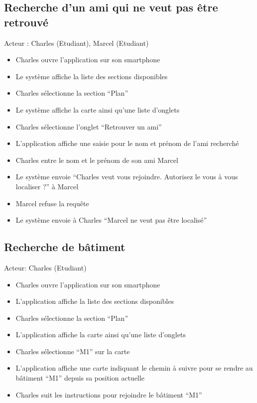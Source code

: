 \subsection*{Recherche d’un ami qui ne veut pas être retrouvé}
Acteur : Charles (Etudiant), Marcel (Etudiant)
\begin{itemize}
\item Charles ouvre l’application sur son smartphone 
\item Le système affiche la liste des sections disponibles 
\item Charles sélectionne la section “Plan” 
\item Le système affiche la carte ainsi qu’une liste d’onglets 
\item Charles sélectionne l’onglet “Retrouver un ami” 
\item L’application affiche une saisie pour le nom et prénom de l'ami recherché 
\item Charles entre le nom et le prénom de son ami Marcel 
\item Le système envoie “Charles veut vous rejoindre.  Autorisez le vous à vous localiser ?” à Marcel 
\item Marcel refuse la requête 
\item Le système envoie à Charles “Marcel ne veut pas être localisé”
\end{itemize}

\subsection*{Recherche de bâtiment}
Acteur: Charles (Etudiant)
\begin{itemize}
\item Charles ouvre l’application sur son smartphone 
\item L’application affiche la liste des sections disponibles 
\item Charles sélectionne la section “Plan” 
\item L’application affiche la carte ainsi qu’une liste d’onglets 
\item Charles sélectionne “M1” sur la carte 
\item L’application affiche une carte indiquant le chemin à suivre pour se rendre au bâtiment “M1” depuis sa position actuelle 
\item Charles suit les instructions pour rejoindre le bâtiment “M1” 
\end{itemize}

